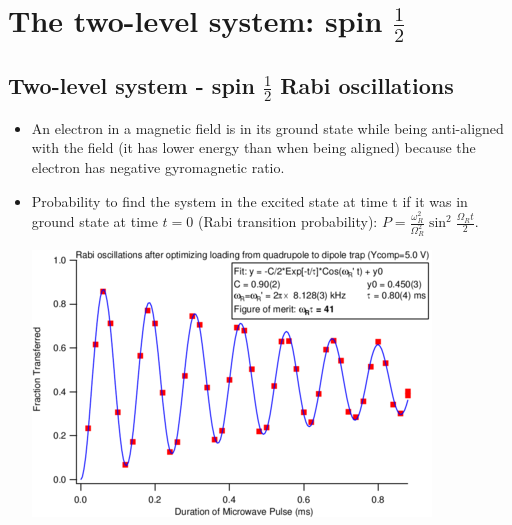 \documentclass[AtomicOptical1Notes.tex]{subfiles}
\begin{document}
\section{The two-level system: spin $\frac{1}{2}$}

	\subsection{Two-level system - spin $\frac{1}{2}$ Rabi oscillations}
		\begin{itemize}
			\item An electron in a magnetic field is in its ground state while being anti-aligned with the field (it has lower energy than when being aligned) because the electron has negative gyromagnetic ratio.
			\item Probability to find the system in the excited state at time t if it was in ground state at time $t=0$ (Rabi transition probability): $ P= \frac{\omega_R^2}{\Omega_R^2} \sin^2 \frac{\Omega_R t}{2} $.
			
			\begin{center}\includegraphics[scale=0.75]{rabiresonance}\end{center}
			
		\end{itemize}
\end{document}
